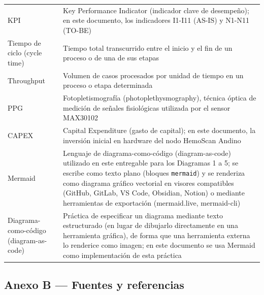 \documentclass[11pt,a4paper]{article}
\begin{document}
{\begin{longtable}[]{@{}
  >{\raggedright\arraybackslash}p{}
  >{\raggedright\arraybackslash}p{}@{}}
KPI & Key Performance Indicator (indicador clave de desempeño); en este documento, los indicadores I1-I11 (AS-IS) y N1-N11 (TO-BE) \\
Tiempo de ciclo (cycle time) & Tiempo total transcurrido entre el inicio y el fin de un proceso o de una de sus etapas \\
Throughput & Volumen de casos procesados por unidad de tiempo en un proceso o etapa determinada \\
PPG & Fotopletismografía (photoplethysmography), técnica óptica de medición de señales fisiológicas utilizada por el sensor MAX30102 \\
CAPEX & Capital Expenditure (gasto de capital); en este documento, la inversión inicial en hardware del nodo HemoScan Andino \\
Mermaid & Lenguaje de diagrama-como-código (diagram-as-code) utilizado en este entregable para los Diagramas 1 a 5; se escribe como texto plano (bloques \texttt{\textasciigrave{}\textasciigrave{}\textasciigrave{}mermaid}) y se renderiza como diagrama gráfico vectorial en visores compatibles (GitHub, GitLab, VS Code, Obsidian, Notion) o mediante herramientas de exportación (mermaid.live, mermaid-cli) \\
Diagrama-como-código (diagram-as-code) & Práctica de especificar un diagrama mediante texto estructurado (en lugar de dibujarlo directamente en una herramienta gráfica), de forma que una herramienta externa lo renderice como imagen; en este documento se usa Mermaid como implementación de esta práctica \\
\end{longtable}
}

\subsection{Anexo B --- Fuentes y referencias}\label{anexo-b-fuentes-y-referencias}
\end{document}
